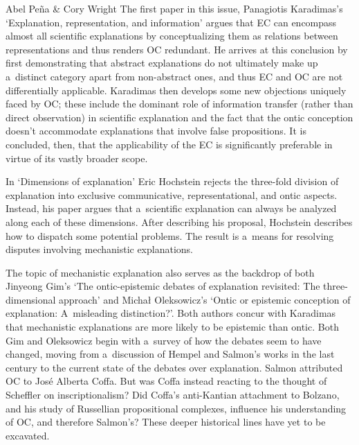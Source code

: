 \begin{editorialeng}{Abel Peña \& Cory Wright}
The first paper in this issue, Panagiotis Karadimas's `Explanation, representation, and information' argues that EC can encompass almost all scientific explanations by conceptualizing them as relations between representations and thus renders OC redundant. He arrives at this conclusion by first demonstrating that abstract explanations do not ultimately make up a~distinct category apart from non-abstract ones, and thus EC and OC are not differentially applicable. Karadimas then develops some new objections uniquely faced by OC; these include the dominant role of information transfer (rather than direct observation) in scientific explanation and the fact that the ontic conception doesn't accommodate explanations that involve false propositions. It is concluded, then, that the applicability of the EC is significantly preferable in virtue of its vastly broader scope.

In `Dimensions of explanation' Eric Hochstein rejects the three-fold division of explanation into exclusive communicative, representational, and ontic aspects. Instead, his paper argues that a~scientific explanation can always be analyzed along each of these dimensions. After describing his proposal, Hochstein describes how to dispatch some potential problems. The result is a~means for resolving disputes involving mechanistic explanations.

The topic of mechanistic explanation also serves as the backdrop of both Jinyeong Gim's `The ontic-epistemic debates of explanation revisited: The three-dimensional approach' and Michał Oleksowicz's `Ontic or epistemic conception of explanation: A~misleading distinction?'. Both authors concur with Karadimas that mechanistic explanations are more likely to be epistemic than ontic. Both Gim and Oleksowicz begin with a~survey of how the debates seem to have changed, moving from a~discussion of Hempel and Salmon's works in the last century to the current state of the debates over explanation. Salmon
\parencite*[][]{salmon_four_1989} %
 attributed OC to José Alberta Coffa. But was Coffa instead reacting to the thought of Scheffler 
\parencite*[][]{scheffler_anatomy_1963} %
 on inscriptionalism? Did Coffa's anti-Kantian attachment to Bolzano, and his study of Russellian propositional complexes, influence his understanding of OC, and therefore Salmon's? These deeper historical lines have yet to be excavated.


\end{editorialeng}
